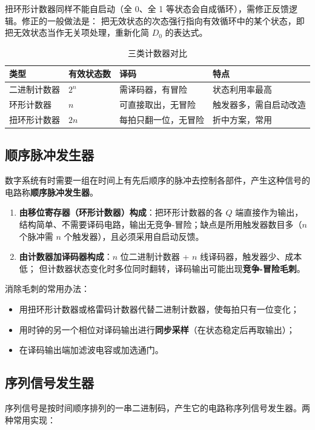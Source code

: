 \noindent 扭环形计数器同样不能自启动（全 0、全 1 等状态会自成循环），需修正反馈逻辑。修正的一般做法是：
把无效状态的次态强行指向有效循环中的某个状态，即把无效状态当作无关项处理，重新化简 $D_0$ 的表达式。

\begin{table}[!htbp]
\centering
\caption{三类计数器对比}
\begin{tabular}{llll}
\toprule
类型 & 有效状态数 & 译码 & 特点 \\
\midrule
二进制计数器 & $2^n$ & 需译码器，有冒险 & 状态利用率最高 \\
环形计数器 & $n$ & 可直接取出，无冒险 & 触发器多，需自启动改造 \\
扭环形计数器 & $2n$ & 每拍只翻一位，无冒险 & 折中方案，常用 \\
\bottomrule
\end{tabular}
\end{table}

\subsection{顺序脉冲发生器}
数字系统有时需要一组在时间上有先后顺序的脉冲去控制各部件，产生这种信号的电路称\textbf{顺序脉冲发生器}。

\begin{enumerate}
    \item \textbf{由移位寄存器（环形计数器）构成}：把环形计数器的各 $Q$ 端直接作为输出，
    结构简单、不需要译码电路，输出无竞争-冒险；缺点是所用触发器数目多（$n$ 个脉冲需 $n$ 个触发器），且必须采用自启动反馈。
    \item \textbf{由计数器加译码器构成}：$n$ 位二进制计数器 + $n$ 线译码器，触发器少、成本低；
    但计数器状态变化时多位同时翻转，译码输出可能出现\textbf{竞争-冒险毛刺}。
\end{enumerate}

\noindent 消除毛刺的常用办法：
\begin{itemize}
    \item 用扭环形计数器或格雷码计数器代替二进制计数器，使每拍只有一位变化；
    \item 用时钟的另一个相位对译码输出进行\textbf{同步采样}（在状态稳定后再取输出）；
    \item 在译码输出端加滤波电容或加选通门。
\end{itemize}

\subsection{序列信号发生器}
序列信号是按时间顺序排列的一串二进制码，产生它的电路称序列信号发生器。两种常用实现：

